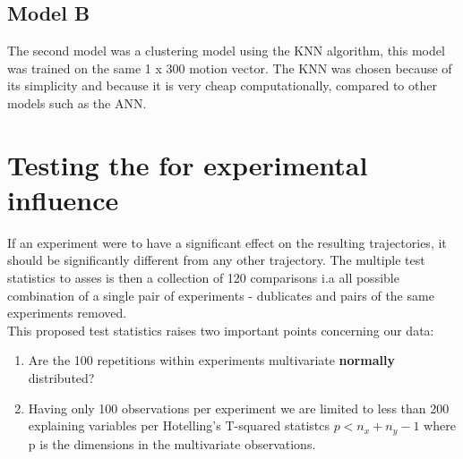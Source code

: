 \documentclass{article}
\begin{document}
\subsection{Model B}
The second model was a clustering model using the KNN algorithm, this model was trained on the same 1 x 300 motion vector.
The KNN was chosen because of its simplicity and because it is very cheap computationally, compared to other models such as the ANN.

\section{Testing the for experimental influence}
If an experiment were to have a significant effect on the resulting trajectories, it should be significantly different from any other trajectory. The multiple test statistics to asses is then a collection of 120 comparisons i.a all possible combination of a single pair of experiments - dublicates and pairs of the same experiments removed.\\ 
This proposed test statistics raises two important points concerning our data:
\begin{enumerate}
	\item  Are the 100 repetitions within experiments multivariate \textbf{normally} distributed?
	\item Having only 100 observations per experiment we are limited to less than 200 explaining variables per Hotelling's T-squared statistcs $p < n_x + n_y -1$ where p is the dimensions in the multivariate observations.
\end{enumerate}
\end{document}
